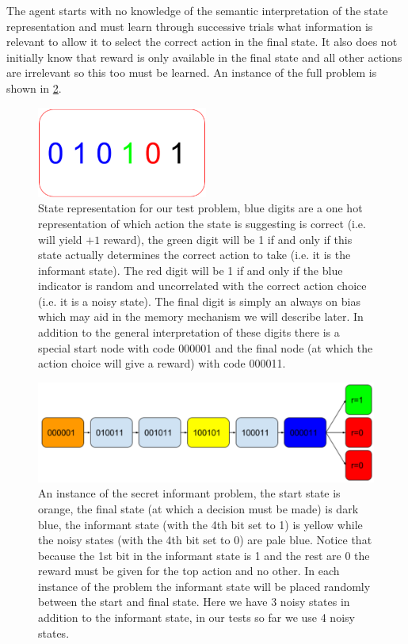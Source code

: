 \documentclass{article}
\begin{document}
The agent starts with no knowledge of the semantic interpretation of the state representation and must learn through successive trials what information is relevant to allow it to select the correct action in the final state. It also does not initially know that reward is only available in the final state and all other actions are irrelevant so this too must be learned. An instance of the full problem is shown in \ref{fig:problem}.
\begin{figure}[!ht]
\center
\includegraphics[width=0.5\textwidth]{images/state.png}
\caption{State representation for our test problem, blue digits are a one hot representation of which action the state is suggesting is correct (i.e. will yield $+1$ reward), the green digit will be 1 if and only if this state actually determines the correct action to take (i.e. it is the informant state). The red digit will be 1 if and only if the blue indicator is random and uncorrelated with the correct action choice (i.e. it is a noisy state). The final digit is simply an always on bias which may aid in the memory mechanism we will describe later. In addition to the general interpretation of these digits there is a special start node with code 000001 and the final node (at which the action choice will give a reward) with code 000011.}
\label{fig:state}
\end{figure}

\begin{figure}[!ht]
\includegraphics[width=1\textwidth]{images/problem.png}
\caption{An instance of the secret informant problem, the start state is orange, the final state (at which a decision must be made) is dark blue, the informant state (with the 4th bit set to 1) is yellow while the noisy states (with the 4th bit set to 0) are pale blue. Notice that because the 1st bit in the informant state is 1 and the rest are 0 the reward must be given for the top action and no other. In each instance of the problem the informant state will be placed randomly between the start and final state. Here we have 3 noisy states in addition to the informant state, in our tests so far we use 4 noisy states.}
\label{fig:problem}
\end{figure}
\end{document}
